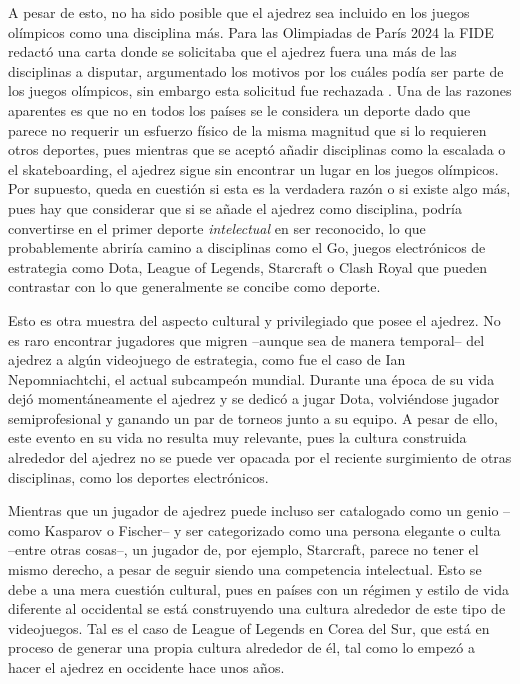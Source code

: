 \documentclass[twoside,openright,12pt,a4paper,spanish]{book}
\begin{document}
A pesar de esto, no ha sido posible que el ajedrez sea incluido en los juegos olímpicos como una disciplina más. Para las Olimpiadas de París 2024 la FIDE redactó una carta donde se solicitaba que el ajedrez fuera una más de las disciplinas a disputar, argumentado los motivos por los cuáles podía ser parte de los juegos olímpicos, sin embargo esta solicitud fue rechazada \cite{olimpicos_sinajedrez}. Una de las razones aparentes es que no en todos los países se le considera un deporte dado que parece no requerir un esfuerzo físico de la misma magnitud que si lo requieren otros deportes, pues mientras que se aceptó añadir disciplinas como la escalada o el skateboarding, el ajedrez sigue sin encontrar un lugar en los juegos olímpicos. Por supuesto, queda en cuestión si esta es la verdadera razón o si existe algo más, pues hay que considerar que si se añade el ajedrez como disciplina, podría convertirse en el primer deporte \emph{intelectual} en ser reconocido, lo que probablemente abriría camino a disciplinas como el Go, juegos electrónicos de estrategia como Dota, League of Legends, Starcraft o Clash Royal que pueden contrastar con lo que generalmente se concibe como deporte.

Esto es otra muestra del aspecto cultural y privilegiado que posee el ajedrez. No es raro encontrar jugadores que migren --aunque sea de manera temporal-- del ajedrez a algún videojuego de estrategia, como fue el caso de Ian Nepomniachtchi, el actual subcampeón mundial. Durante una época de su vida dejó momentáneamente el ajedrez y se dedicó a jugar Dota, volviéndose jugador semiprofesional y ganando un par de torneos junto a su equipo. A pesar de ello, este evento en su vida no resulta muy relevante, pues la cultura construida alrededor del ajedrez no se puede ver opacada por el reciente surgimiento de otras disciplinas, como los deportes electrónicos.

Mientras que un jugador de ajedrez puede incluso ser catalogado como un genio --como Kasparov o Fischer-- y ser categorizado como una persona elegante o culta --entre otras cosas--, un jugador de, por ejemplo, Starcraft, parece no tener el mismo derecho, a pesar de seguir siendo una competencia intelectual. Esto se debe a una mera cuestión cultural, pues en países con un régimen y estilo de vida diferente al occidental se está construyendo una cultura alrededor de este tipo de videojuegos. Tal es el caso de League of Legends en Corea del Sur, que está en proceso de generar una propia cultura alrededor de él, tal como lo empezó a hacer el ajedrez en occidente hace unos años.
\end{document}
